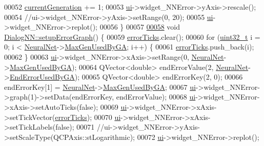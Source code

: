 \begin{DoxyCode}
{00052   \hyperlink{class_dialog_n_n_a886cc6b16f26f822a3a39ed7812f26a5}{currentGeneration} += 1;
00053   \hyperlink{class_dialog_n_n_affd6ce2909be5826c52fd862d1963eee}{ui}->widget\_NNError->yAxis->rescale();
00054   \textcolor{comment}{//ui->widget\_NNError->yAxis->setRange(0, 20);}
00055   \hyperlink{class_dialog_n_n_affd6ce2909be5826c52fd862d1963eee}{ui}->widget\_NNError->replot();
00056 \}
00057 
\hypertarget{dialognn_8cpp_source_l00058}{}\hyperlink{class_dialog_n_n_ae3abaadf57d6614cddb1a9c244da721d}{00058} \textcolor{keywordtype}{void} \hyperlink{class_dialog_n_n_ae3abaadf57d6614cddb1a9c244da721d}{DialogNN::setupErrorGraph}() \{
00059   \hyperlink{class_dialog_n_n_af0eb5fbc415d948bedf5120bdd256e1c}{errorTicks}.clear();
00060   \textcolor{keywordflow}{for} (\hyperlink{_soil_math_types_8h_a435d1572bf3f880d55459d9805097f62}{uint32\_t} i = 0; i < \hyperlink{class_dialog_n_n_a1d38f96a8f11697068e805fdaa3267b2}{NeuralNet}->\hyperlink{class_soil_math_1_1_n_n_a360b26e66639b4eed186a62cdbac37e0}{MaxGenUsedByGA}; i++) \{
00061     \hyperlink{class_dialog_n_n_af0eb5fbc415d948bedf5120bdd256e1c}{errorTicks}.push\_back(i);
00062   \}
00063   \hyperlink{class_dialog_n_n_affd6ce2909be5826c52fd862d1963eee}{ui}->widget\_NNError->xAxis->setRange(0, \hyperlink{class_dialog_n_n_a1d38f96a8f11697068e805fdaa3267b2}{NeuralNet}->\hyperlink{class_soil_math_1_1_n_n_a360b26e66639b4eed186a62cdbac37e0}{MaxGenUsedByGA});
00064   QVector<double> endErrorValue(2, \hyperlink{class_dialog_n_n_a1d38f96a8f11697068e805fdaa3267b2}{NeuralNet}->\hyperlink{class_soil_math_1_1_n_n_aa29b48e0711848633d5cdbb22055910d}{EndErrorUsedByGA});
00065   QVector<double> endErrorKey(2, 0);
00066   endErrorKey[1] = \hyperlink{class_dialog_n_n_a1d38f96a8f11697068e805fdaa3267b2}{NeuralNet}->\hyperlink{class_soil_math_1_1_n_n_a360b26e66639b4eed186a62cdbac37e0}{MaxGenUsedByGA};
00067   \hyperlink{class_dialog_n_n_affd6ce2909be5826c52fd862d1963eee}{ui}->widget\_NNError->graph(1)->setData(endErrorKey, endErrorValue);
00068   \hyperlink{class_dialog_n_n_affd6ce2909be5826c52fd862d1963eee}{ui}->widget\_NNError->xAxis->setAutoTicks(\textcolor{keyword}{false});
00069   \hyperlink{class_dialog_n_n_affd6ce2909be5826c52fd862d1963eee}{ui}->widget\_NNError->xAxis->setTickVector(\hyperlink{class_dialog_n_n_af0eb5fbc415d948bedf5120bdd256e1c}{errorTicks});
00070   \hyperlink{class_dialog_n_n_affd6ce2909be5826c52fd862d1963eee}{ui}->widget\_NNError->xAxis->setTickLabels(\textcolor{keyword}{false});
00071   \textcolor{comment}{//ui->widget\_NNError->yAxis->setScaleType(QCPAxis::stLogarithmic);}
00072   \hyperlink{class_dialog_n_n_affd6ce2909be5826c52fd862d1963eee}{ui}->widget\_NNError->replot();
}
\end{DoxyCode}
